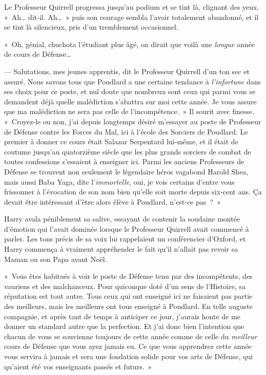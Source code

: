 Le Professeur Quirrell progressa jusqu'au podium et se tint là, clignant des yeux. «~Ah… dit-il. Ah…~» puis son courage sembla l'avoir totalement abandonné, et il se tint là silencieux, pris d'un tremblement occasionnel.

«~Oh, génial, chuchota l'étudiant plus âgé, on dirait que voilà une \emph{longue} année de cours de Défense…

--- Salutations, mes jeunes apprentis, dit le Professeur Quirrell d'un ton sec et assuré. Nous savons tous que Poudlard a une certaine tendance à \emph{l'infortune} dans ses choix pour ce poste, et nul doute que nombreux sont ceux qui parmi vous se demandent déjà quelle malédiction s'abattra sur moi cette année. Je vous assure que ma malédiction ne sera pas celle de l'incompétence.~» Il sourit avec finesse. «~Croyez-le ou non, j'ai depuis longtemps désiré m'essayer au poste de Professeur de Défense contre les Forces du Mal, ici à l'école des Sorciers de Poudlard. Le premier à donner ce cours était Salazar Serpentard lui-même, et il était de coutume jusqu'au quatorzième siècle que les plus grands sorciers de combat de toutes confessions s'essaient à enseigner ici. Parmi les anciens Professeurs de Défense se trouvent non seulement le légendaire héros vagabond Harold Shea, mais aussi Baba Yaga, dite l'\emph{immortelle}, oui, je vois certains d'entre vous frissonner à l'évocation de son nom bien qu'elle soit morte depuis six-cent ans. Ça devait être intéressant d'être alors élève à Poudlard, n'est-ce pas~?~»

Harry avala péniblement sa salive, essayant de contenir la soudaine montée d'émotion qui l'avait dominée lorsque le Professeur Quirrell avait commencé à parler. Les tons précis de sa voix lui rappelaient un conférencier d'Oxford, et Harry commença à vraiment appréhender le fait qu'il n'allait pas revoir sa Maman ou son Papa avant Noël.

«~Vous êtes habitués à voir le poste de Défense tenu par des incompétents, des vauriens et des malchanceux. Pour quiconque doté d'un sens de l'Histoire, sa réputation est tout autre. Tous ceux qui ont enseigné ici ne faisaient pas partie des meilleurs, mais les meilleurs ont tous enseigné à Poudlard. En telle auguste compagnie, et après tant de temps à anticiper ce jour, j'aurais honte de me donner un standard autre que la perfection. Et j'ai donc bien l'intention que chacun de vous se souvienne toujours de cette année comme de celle du \emph{meilleur} cours de Défense que vous ayez jamais eu. Ce que vous apprendrez cette année vous servira à jamais et sera une fondation solide pour vos arts de Défense, qui qu'aient été vos enseignants passés et futurs.~»

